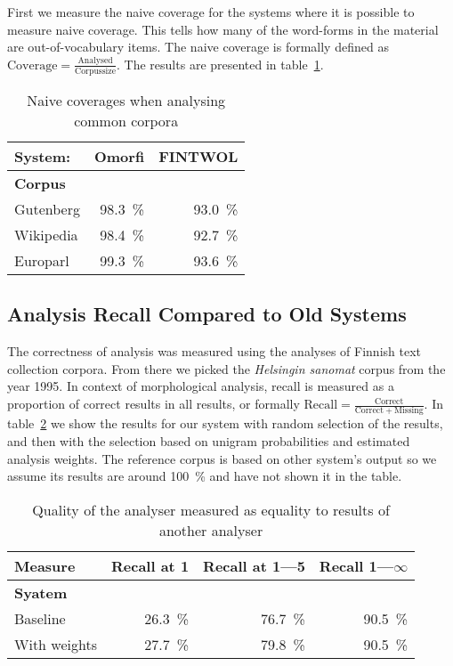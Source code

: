 \documentclass[a4paper,12pt]{article}
\begin{document}
First we measure the naive coverage for the systems where it is possible to
measure naive coverage. This tells how many of the word-forms in the material
are out-of-vocabulary items. The naive coverage is formally defined as
$\mathrm{Coverage} = \frac{\mathrm{Analysed}}{\mathrm{Corpus size}}$. The
results are presented in table~\ref{table:coverage}. 

\begin{table}
    \centering
    \begin{tabular}{|l|r|r|}
        \hline
        \bf System: & Omorfi & FINTWOL \\
        \hline
        \bf Corpus & & \\
        \hline
        Gutenberg & 98.3~\% & 93.0~\%   \\
        Wikipedia & 98.4~\% & 92.7~\% \\
        Europarl  & 99.3~\% & 93.6~\% \\
        \hline
    \end{tabular}
    \caption{Naive coverages when analysing common corpora
    \label{table:coverage}}
\end{table}

\subsection{Analysis Recall Compared to Old Systems}

The correctness of analysis was measured using the analyses of Finnish text
collection corpora. From there we picked the \emph{Helsingin sanomat} corpus
from the year 1995. In context of morphological analysis, recall is measured as
a proportion of correct results in all results, or formally $\mathrm{Recall} =
\frac{\mathrm{Correct}}{\mathrm{Correct} + \mathrm{Missing}}$. In 
table~\ref{table:quality} we show the results for our system with random
selection of the results, and then with the selection based on unigram 
probabilities and estimated analysis weights. The reference corpus is based on
other system's output so we assume its results are around 100~\% and have not
shown it in the table.

\begin{table}
    \centering
    \begin{tabular}{|l|r|r|r|}
        \hline
        \bf Measure & Recall at 1 & Recall at 1---5 & Recall 1---$\infty$  \\
        \hline
        \bf Syatem & & & \\
        \hline
        Baseline & 26.3~\% & 76.7~\% & 90.5~\%\\
        With weights & 27.7~\% & 79.8~\% & 90.5~\%\\
        \hline
    \end{tabular}
    \caption{Quality of the analyser measured as equality to results of
        another analyser \label{table:quality}}
\end{table}
\end{document}
